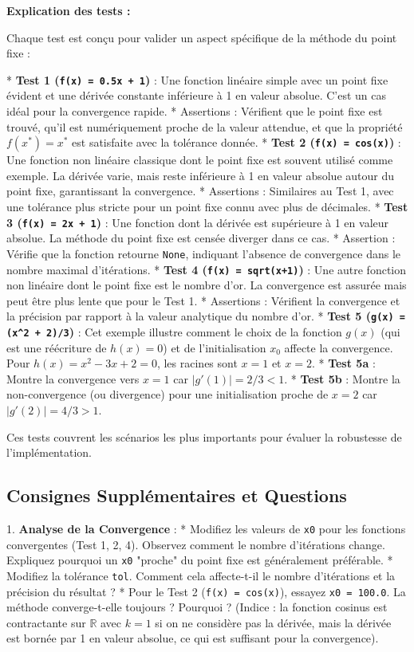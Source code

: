 \documentclass[12pt,a4paper]{report}
\begin{document}
\textbf{Explication des tests :}

Chaque test est conçu pour valider un aspect spécifique de la méthode du point fixe :

*   \textbf{Test 1 (\texttt{f(x) = 0.5x + 1})} : Une fonction linéaire simple avec un point fixe évident et une dérivée constante inférieure à 1 en valeur absolue. C'est un cas idéal pour la convergence rapide.
    *   Assertions : Vérifient que le point fixe est trouvé, qu'il est numériquement proche de la valeur attendue, et que la propriété $f(x^*) = x^*$ est satisfaite avec la tolérance donnée.
*   \textbf{Test 2 (\texttt{f(x) = cos(x)})} : Une fonction non linéaire classique dont le point fixe est souvent utilisé comme exemple. La dérivée varie, mais reste inférieure à 1 en valeur absolue autour du point fixe, garantissant la convergence.
    *   Assertions : Similaires au Test 1, avec une tolérance plus stricte pour un point fixe connu avec plus de décimales.
*   \textbf{Test 3 (\texttt{f(x) = 2x + 1})} : Une fonction dont la dérivée est supérieure à 1 en valeur absolue. La méthode du point fixe est censée diverger dans ce cas.
    *   Assertion : Vérifie que la fonction retourne \texttt{None}, indiquant l'absence de convergence dans le nombre maximal d'itérations.
*   \textbf{Test 4 (\texttt{f(x) = sqrt(x+1)})} : Une autre fonction non linéaire dont le point fixe est le nombre d'or. La convergence est assurée mais peut être plus lente que pour le Test 1.
    *   Assertions : Vérifient la convergence et la précision par rapport à la valeur analytique du nombre d'or.
*   \textbf{Test 5 (\texttt{g(x) = (x\textasciicircum 2 + 2)/3})} : Cet exemple illustre comment le choix de la fonction $g(x)$ (qui est une réécriture de $h(x)=0$) et de l'initialisation $x_0$ affecte la convergence. Pour $h(x) = x^2 - 3x + 2 = 0$, les racines sont $x=1$ et $x=2$.
    *   \textbf{Test 5a} : Montre la convergence vers $x=1$ car $|g'(1)| = 2/3 < 1$.
    *   \textbf{Test 5b} : Montre la non-convergence (ou divergence) pour une initialisation proche de $x=2$ car $|g'(2)| = 4/3 > 1$.

Ces tests couvrent les scénarios les plus importants pour évaluer la robustesse de l'implémentation.

\subsection{Consignes Supplémentaires et Questions}

1.  \textbf{Analyse de la Convergence} :
    *   Modifiez les valeurs de \texttt{x0} pour les fonctions convergentes (Test 1, 2, 4). Observez comment le nombre d'itérations change. Expliquez pourquoi un \texttt{x0} "proche" du point fixe est généralement préférable.
    *   Modifiez la tolérance \texttt{tol}. Comment cela affecte-t-il le nombre d'itérations et la précision du résultat ?
    *   Pour le Test 2 (\texttt{f(x) = cos(x)}), essayez \texttt{x0 = 100.0}. La méthode converge-t-elle toujours ? Pourquoi ? (Indice : la fonction cosinus est contractante sur $\mathbb{R}$ avec $k=1$ si on ne considère pas la dérivée, mais la dérivée est bornée par 1 en valeur absolue, ce qui est suffisant pour la convergence).
\end{document}
